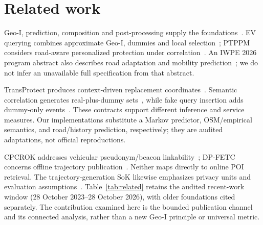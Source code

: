\section{Related work}\label{sec:related}
Geo-I, prediction, composition and post-processing supply the
foundations~\cite{geoi,predictive,dworkroth}. EV querying combines approximate
Geo-I, dummies and local selection~\cite{ev}; PTPPM considers road-aware
personalized protection under correlation~\cite{ptppm}. An IWPE 2026 program
abstract also describes road adaptation and mobility prediction~\cite{iwpe26};
we do not infer an unavailable full specification from that abstract.

TransProtect produces context-driven replacement coordinates~\cite{transprotect}.
Semantic correlation generates real-plus-dummy sets~\cite{semantic}, while fake
query insertion adds dummy-only events~\cite{fake}. These contracts support
different inference and service measures. Our implementations substitute a
Markov predictor, OSM/empirical semantics, and road/history prediction,
respectively; they are audited adaptations, not official reproductions.

CPCROK addresses vehicular pseudonym/beacon linkability~\cite{cpcrok};
DP-FETC concerns offline trajectory publication~\cite{dpfetc}. Neither maps
directly to online POI retrieval. The trajectory-generation SoK likewise
emphasizes privacy units and evaluation assumptions~\cite{sok}.
Table~\ref{tab:related} retains the audited recent-work window
(28 October 2023--28 October 2026), with older foundations cited separately.
The contribution examined here is the bounded publication channel and its
connected analysis, rather than a new Geo-I principle or universal metric.

